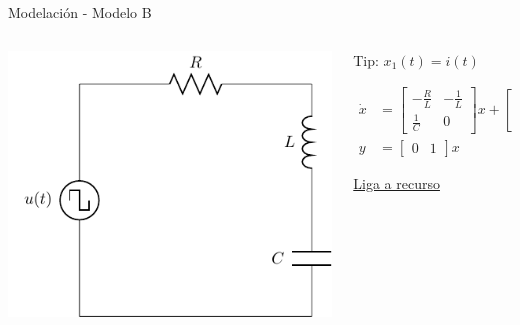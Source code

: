 \documentclass[presentation,aspectratio=1610]{beamer}
\begin{document}
\begin{frame}[label={sec:orgbe8658e}]{Modelación - Modelo \alert{B}}
\begin{columns}
\begin{column}{0.5\columnwidth}
\includegraphics[height=0.5\textheight]{../../figures/RLC-circuit}
\end{column}


\begin{column}{0.5\columnwidth}
Tip: \(x_1(t) = i(t)\)

\begin{align*}
\dot{x} &= \begin{bmatrix} -\frac{R}{L} & -\frac{1}{L}\\\frac{1}{C} & 0\end{bmatrix} x + \begin{bmatrix}\frac{1}{L}\\0\end{bmatrix}u\\ 
y &= \begin{bmatrix} 0 & 1\end{bmatrix} x 
\end{align*}

\href{https://lpsa.swarthmore.edu/Representations/SysRepSS.html\#ExDirDerSSElec}{Liga a recurso}
\end{column}
\end{columns}
\end{frame}
\end{document}
